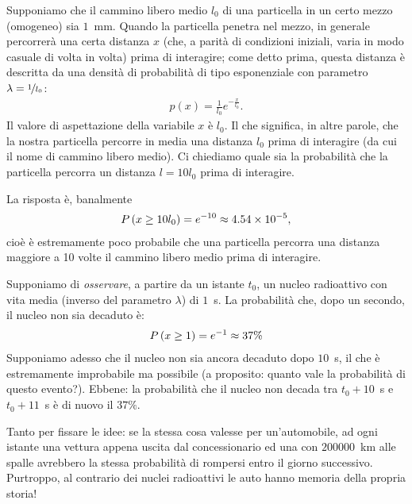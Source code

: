 \begin{examplebox}
  \begin{example}
    Supponiamo che il cammino libero medio $l_0$ di una particella in un
    certo mezzo (omogeneo) sia $1$~mm. Quando la particella penetra nel mezzo,
    in generale percorrerà una certa distanza $x$ (che, a parità di
    condizioni iniziali, varia in modo casuale di volta in volta) prima di
    interagire; come detto prima, questa distanza è descritta da una
    densità di probabilità di tipo esponenziale con parametro
    $\lambda = \nicefrac{1}{l_0}$:
    \begin{align*}
      p(x) = \frac{1}{l_0}e^{-\frac{x}{l_0}}.
    \end{align*}
    Il valore di aspettazione della variabile $x$ è $l_0$. Il che
    significa, in altre parole, che la nostra particella percorre in media
    una distanza $l_0$ prima di interagire (da cui il nome di cammino
    libero medio). Ci chiediamo quale sia la probabilità che la particella
    percorra un distanza $l = 10l_0$ prima di interagire.

    La risposta è, banalmente
    \begin{align*}
      \displaystyle P\left(x \geq 10l_0\right) = e^{-10} \approx 4.54 \times 10^{-5},
    \end{align*}
    cioè è estremamente poco probabile che una particella percorra una
    distanza maggiore a 10 volte il cammino libero medio prima di interagire.
  \end{example}

  \begin{example}
    Supponiamo di {\itshape osservare}, a partire da un istante $t_0$, un
    nucleo radioattivo con vita media (inverso del parametro $\lambda$) di
    $1$~s. La probabilità che, dopo un secondo, il nucleo non sia decaduto
    è:
    \begin{align*}
      \displaystyle P\left(x \geq 1\right) = e^{-1} \approx 37\%
    \end{align*}
    Supponiamo adesso che il nucleo non sia ancora decaduto dopo $10$~s, il che
    è estremamente improbabile ma possibile (a proposito: quanto vale la
    probabilità di questo evento?). Ebbene: la probabilità che il nucleo
    non decada tra $t_0 + 10$~s e $t_0 + 11$~s è di nuovo il $37\%$.

    Tanto per fissare le idee: se la stessa cosa valesse per un'automobile,
    ad ogni istante una vettura appena uscita dal concessionario ed una con
    $200000$~km alle spalle avrebbero la stessa probabilità di rompersi
    entro il giorno successivo. Purtroppo, al contrario dei nuclei
    radioattivi le auto hanno memoria della propria storia!
  \end{example}
\end{examplebox}


